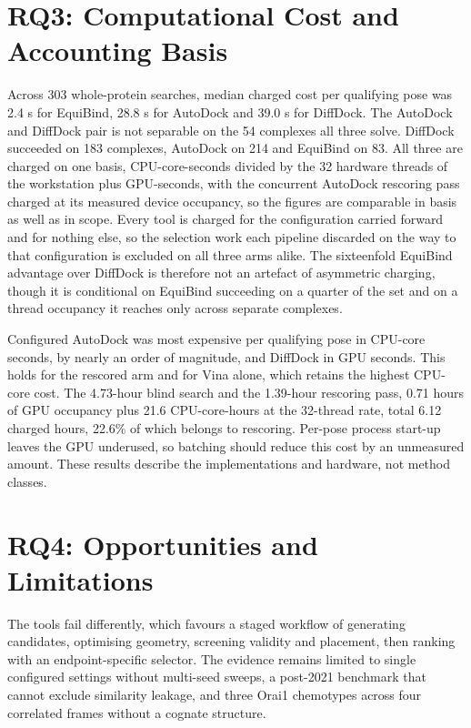 \hypertarget{rq3-computational-efficiency}{%
\section{RQ3: Computational Cost and Accounting Basis}\label{rq3-computational-efficiency}}

Across 303 whole-protein searches, median charged cost per qualifying pose was 2.4 s for EquiBind, 28.8 s for AutoDock and 39.0 s for DiffDock. The AutoDock and DiffDock pair is not separable on the 54 complexes all three solve. DiffDock succeeded on 183 complexes, AutoDock on 214 and EquiBind on 83. All three are charged on one basis, CPU-core-seconds divided by the 32 hardware threads of the workstation plus GPU-seconds, with the concurrent AutoDock rescoring pass charged at its measured device occupancy, so the figures are comparable in basis as well as in scope. Every tool is charged for the configuration carried forward and for nothing else, so the selection work each pipeline discarded on the way to that configuration is excluded on all three arms alike. The sixteenfold EquiBind advantage over DiffDock is therefore not an artefact of asymmetric charging, though it is conditional on EquiBind succeeding on a quarter of the set and on a thread occupancy it reaches only across separate complexes.

Configured AutoDock was most expensive per qualifying pose in CPU-core seconds, by nearly an order of magnitude, and DiffDock in GPU seconds. This holds for the rescored arm and for Vina alone, which retains the highest CPU-core cost. The 4.73-hour blind search and the 1.39-hour rescoring pass, 0.71 hours of GPU occupancy plus 21.6 CPU-core-hours at the 32-thread rate, total 6.12 charged hours, 22.6\% of which belongs to rescoring. Per-pose process start-up leaves the GPU underused, so batching should reduce this cost by an unmeasured amount. These results describe the implementations and hardware, not method classes.

\hypertarget{rq4-opportunities-and-limitations}{%
\section{RQ4: Opportunities and Limitations}\label{rq4-opportunities-and-limitations}}

The tools fail differently, which favours a staged workflow of generating candidates, optimising geometry, screening validity and placement, then ranking with an endpoint-specific selector. The evidence remains limited to single configured settings without multi-seed sweeps, a post-2021 benchmark that cannot exclude similarity leakage, and three Orai1 chemotypes across four correlated frames without a cognate structure.

